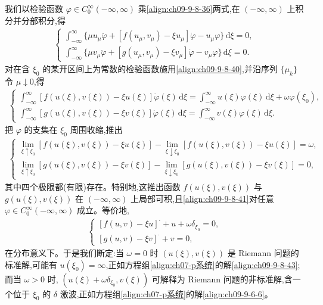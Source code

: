 \documentclass[../../main.tex]{subfiles}
\begin{document}
我们以检验函数 $\varphi\in C_{0}^{\infty}(-\infty,\infty)$ 乘\eqref{align:ch09-9-8-36}两式,在 $(-\infty,\infty)$ 上积分并分部积分,得
\begin{align}
\begin{cases}
\displaystyle\int_{-\infty}^{\infty}\{\mu u_{\mu}\ddot{\varphi}+[f(u_{\mu},v_{\mu})-\xi u_{\mu}]\dot{\varphi}-u_{\mu}\varphi\}\,\mathrm{d}\xi=0,\\[2mm]
\displaystyle\int_{-\infty}^{\infty}\{\mu v_{\mu}\ddot{\varphi}+[g(u_{\mu},v_{\mu})-\xi v_{\mu}]\dot{\varphi}-v_{\mu}\varphi\}\,\mathrm{d}\xi=0.
\end{cases}
\label{align:ch09-9-8-40}
\end{align}
对在含 $\xi_{0}$ 的某开区间上为常数的检验函数施用\eqref{align:ch09-9-8-40},并沿序列 $\{\mu_{k}\}$ 令 $\mu\downarrow0$,得
\begin{align}
\begin{cases}
\displaystyle\int_{-\infty}^{\infty}[f(u(\xi),v(\xi))-\xi u(\xi)]\dot{\varphi}(\xi)\,\mathrm{d}\xi
=\int_{-\infty}^{\infty}u(\xi)\varphi(\xi)\,\mathrm{d}\xi+\omega\varphi(\xi_{0}),\\[2mm]
\displaystyle\int_{-\infty}^{\infty}[g(u(\xi),v(\xi))-\xi v(\xi)]\dot{\varphi}(\xi)\,\mathrm{d}\xi
=\int_{-\infty}^{\infty}v(\xi)\varphi(\xi)\,\mathrm{d}\xi.
\end{cases}
\label{align:ch09-9-8-41}
\end{align}
把 $\varphi$ 的支集在 $\xi_{0}$ 周围收缩,推出
\begin{align}
\begin{cases}
\lim_{\xi\uparrow\xi_{0}}[f(u(\xi),v(\xi))-\xi u(\xi)]-\lim_{\xi\downarrow\xi_{0}}[f(u(\xi),v(\xi))-\xi u(\xi)]=\omega,\\[1mm]
\lim_{\xi\uparrow\xi_{0}}[g(u(\xi),v(\xi))-\xi v(\xi)]-\lim_{\xi\downarrow\xi_{0}}[g(u(\xi),v(\xi))-\xi v(\xi)]=0,
\end{cases}
\label{align:ch09-9-8-42}
\end{align}
其中四个极限都(有限)存在。特别地,这推出函数 $f(u(\xi),v(\xi))$ 与 $g(u(\xi),v(\xi))$ 在 $(-\infty,\infty)$ 上局部可积,且\eqref{align:ch09-9-8-41}对任意 $\varphi\in C_{0}^{\infty}(-\infty,\infty)$ 成立。等价地,
\begin{align}
\begin{cases}
[f(u,v)-\xi u]^{\cdot}+u+\omega\delta_{\xi_{0}}=0,\\
[g(u,v)-\xi v]^{\cdot}+v=0,
\end{cases}
\label{align:ch09-9-8-43}
\end{align}
在分布意义下。于是我们断定:当 $\omega=0$ 时 $(u(\xi),v(\xi))$ 是 Riemann 问题的标准解,可能有 $u(\xi_{0})=\infty$,正如方程组\eqref{align:ch07-p系统}的解\eqref{align:ch09-9-8-43};而当 $\omega>0$ 时, $(u(\xi)+\omega\delta_{\xi_{0}},v(\xi))$ 可解释为 Riemann 问题的非标准解,含一个位于 $\xi_{0}$ 的 $\delta$ 激波,正如方程组\eqref{align:ch07-p系统}的解\eqref{align:ch09-9-6-6}。
\end{document}
